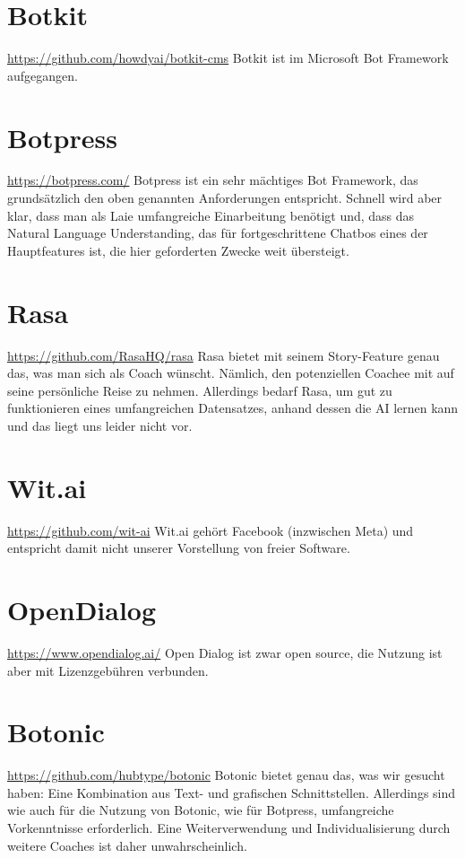 \section{Botkit} \url{https://github.com/howdyai/botkit-cms}
Botkit ist im Microsoft Bot Framework aufgegangen. 

\section{Botpress} \url{https://botpress.com/}
Botpress ist ein sehr mächtiges Bot Framework, das grundsätzlich den oben genannten Anforderungen entspricht. Schnell wird aber klar, dass man als Laie umfangreiche Einarbeitung benötigt und, dass das Natural Language Understanding, das für fortgeschrittene Chatbos eines der Hauptfeatures ist, die hier geforderten Zwecke weit übersteigt.

\section{Rasa} \url{https://github.com/RasaHQ/rasa}
Rasa bietet mit seinem Story-Feature genau das, was man sich als Coach wünscht. Nämlich, den potenziellen Coachee mit auf seine persönliche Reise zu nehmen. Allerdings bedarf Rasa, um gut zu funktionieren eines umfangreichen Datensatzes, anhand dessen die AI lernen kann und das liegt uns leider nicht vor.

\section{Wit.ai} \url{https://github.com/wit-ai}
Wit.ai gehört Facebook (inzwischen Meta) und entspricht damit nicht unserer Vorstellung von freier Software.

\section{OpenDialog} \url{https://www.opendialog.ai/}
Open Dialog ist zwar open source, die Nutzung ist aber mit Lizenzgebühren verbunden.

\section{Botonic} \url{https://github.com/hubtype/botonic}
Botonic bietet genau das, was wir gesucht haben: Eine Kombination aus Text- und grafischen Schnittstellen. Allerdings sind wie auch für die Nutzung von Botonic, wie für Botpress, umfangreiche Vorkenntnisse erforderlich. Eine Weiterverwendung und Individualisierung durch weitere Coaches ist daher unwahrscheinlich.


